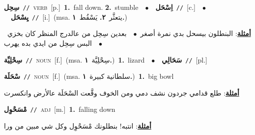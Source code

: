 \documentclass[10pt,a4paper,twoside]{article} %
\begin{document}
\begin{multicols}{2}
{\setlength\topsep{0pt}\textbf{\foreignlanguage{arabic}{سِحِل}}\ {\color{gray}\texttt{//}\color{black}}\ \textsc{verb}\ [p.]\ \textbf{1.}~fall down.  \textbf{2.}~stumble\ \ $\bullet$\ \ \setlength\topsep{0pt}\textbf{\foreignlanguage{arabic}{اِسْحَل}}\ {\color{gray}\texttt{//}\color{black}}\ [c.]\ \ $\bullet$\ \ \setlength\topsep{0pt}\textbf{\foreignlanguage{arabic}{يِسْحَل}}\ {\color{gray}\texttt{//}\color{black}}\ [i.]\ \color{gray}(msa. \foreignlanguage{arabic}{يتعثَّر}~\foreignlanguage{arabic}{\textbf{٢.}}  \foreignlanguage{arabic}{يَسْقُط}~\foreignlanguage{arabic}{\textbf{١.}})\color{black}\  \begin{flushright}\color{gray}\foreignlanguage{arabic}{\textbf{\underline{\foreignlanguage{arabic}{أمثلة}}}: البنطلون بيسحل بدي نمرة أصغر\ $\bullet$\ \  بعدين سِحِل من عالدرج المنظر كان بخزي\ $\bullet$\ \  البس سِحِل من ايدي بده يهرب}\end{flushright}\color{black}} \vspace{2mm}

{\setlength\topsep{0pt}\textbf{\foreignlanguage{arabic}{سِحْلِيِّة}}\ {\color{gray}\texttt{//}\color{black}}\ \textsc{noun}\ [f.]\ \color{gray}(msa. \foreignlanguage{arabic}{سِحْلِيَّة}~\foreignlanguage{arabic}{\textbf{١.}})\color{black}\ \textbf{1.}~lizard\ \ $\bullet$\ \ \setlength\topsep{0pt}\textbf{\foreignlanguage{arabic}{سَحَالِي}}\ {\color{gray}\texttt{//}\color{black}}\ [pl.]\ } \vspace{2mm}

{\setlength\topsep{0pt}\textbf{\foreignlanguage{arabic}{سْحَلَة}}\ {\color{gray}\texttt{//}\color{black}}\ \textsc{noun}\ [f.]\ \color{gray}(msa. \foreignlanguage{arabic}{سلطانية كبيرة}~\foreignlanguage{arabic}{\textbf{١.}})\color{black}\ \textbf{1.}~big bowl\  \begin{flushright}\color{gray}\foreignlanguage{arabic}{\textbf{\underline{\foreignlanguage{arabic}{أمثلة}}}: طلع قدامي جردون نشف دمي ومن الخوف وقَّعت السْحَلَة عالأرض وانكسرت}\end{flushright}\color{black}} \vspace{2mm}

{\setlength\topsep{0pt}\textbf{\foreignlanguage{arabic}{مْسَحْوِل}}\ {\color{gray}\texttt{//}\color{black}}\ \textsc{adj}\ [m.]\ \textbf{1.}~falling down\  \begin{flushright}\color{gray}\foreignlanguage{arabic}{\textbf{\underline{\foreignlanguage{arabic}{أمثلة}}}: انتبه! بنطلونك مْسَحْوِل وكل شي مبين من ورا}\end{flushright}\color{black}} \vspace{2mm}


\end{multicols}
\end{document}
